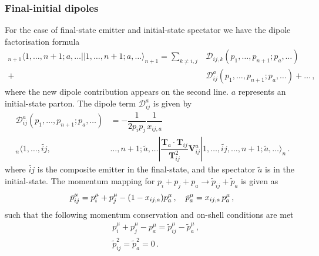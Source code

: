 \documentclass[main.tex]{subfiles}
\begin{document}
        \subsubsection{Final-initial dipoles}
        For the case of final-state emitter and initial-state
        spectator we have the dipole factorisation formula
        \begin{equation}\label{eqn:FI_factorisation}
            \begin{split}
                {}_{n+1}\langle 1, \ldots, n+1; a, \ldots || 1, \ldots, n+1; a, \ldots \rangle_{n+1} = \sum_{k\neq i,j} &\mathcal{D}_{ij,k}(p_{1},\ldots,p_{n+1};p_{a},\ldots) \\
                + &\mathcal{D}_{ij}^{a}(p_{1},\ldots,p_{n+1};p_{a},\ldots) + \ldots \, ,
            \end{split}
        \end{equation}
        where the new dipole contribution appears on the second line. $a$ represents an initial-state parton.
        The dipole term $\mathcal{D}_{ij}^{a}$ is given by
        \begin{equation}\label{eqn:D_aij}
            \begin{split}
                \mathcal{D}_{ij}^{a}(p_{1}, \ldots, p_{n+1}; p_{a}, \ldots) &= -\dfrac{1}{2p_{i}p_{j}} \dfrac{1}{x_{ij,a}} \\
                {}_{n} \langle 1, \ldots, \widetilde{ij}, &\ldots, n+1; \tilde{a}, \ldots | \dfrac{\boldsymbol{T}_{a} \cdot \boldsymbol{T}_{ij}}{\boldsymbol{T}_{ij}^{2}} \boldsymbol{V}_{ij}^{a} | 1, \ldots, \widetilde{ij}, \ldots, n+1; \tilde{a} , \ldots \rangle_{n} \, .
            \end{split}
        \end{equation}
        where $\widetilde{ij}$ is the composite emitter in the
        final-state, and the spectator $\tilde{a}$ is in the initial-state.
        The momentum mapping for $p_{i} + p_{j} + p_{a} \rightarrow \tilde{p}_{ij} + \tilde{p}_{a}$ is given as
        \begin{equation}\label{eqn:FI_mapping}
            \tilde{p}_{ij}^{\mu} = p_{i}^{\mu} + p_{j}^{\mu} - (1-x_{ij,a})p_{a}^{\mu} \, , \quad \tilde{p}_{a}^{\mu} = x_{ij,a} \, p_{a}^{\mu} \, , \\
        \end{equation}
        such that the following momentum conservation and on-shell conditions are met
        \begin{equation}\label{eqn:FI_mapping_conditions}
            \begin{split}
                &p_{i}^{\mu} + p_{j}^{\mu} - p_{a}^{\mu} = \tilde{p}_{ij}^{\mu} - \tilde{p}_{a}^{\mu} \, , \\
                &\tilde{p}_{ij}^{2} = \tilde{p}_{a}^{2} = 0 \, .
            \end{split}
        \end{equation}
\end{document}
